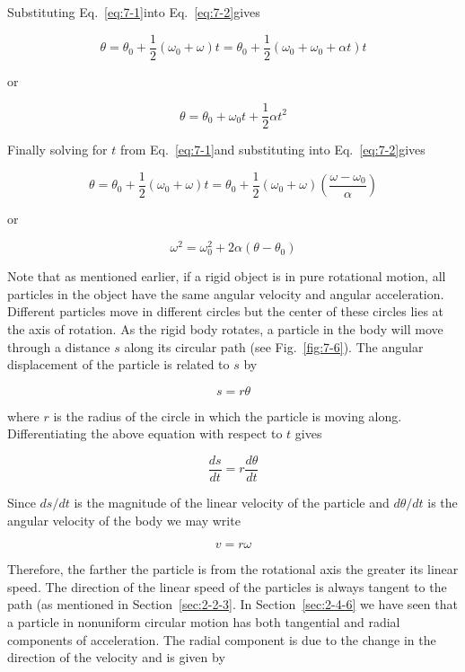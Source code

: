 \documentclass[10pt]{article}
\numberwithin{equation}{section}
\begin{document}
Substituting Eq.~\eqref{eq:7-1}into Eq.~\eqref{eq:7-2}gives

$$
\theta=\theta_{0}+\frac{1}{2}\left(\omega_{0}+\omega\right) t=\theta_{0}+\frac{1}{2}\left(\omega_{0}+\omega_{0}+\alpha t\right) t
$$

or


\begin{equation}
\theta=\theta_{0}+\omega_{0} t+\frac{1}{2} \alpha t^{2} \label{eq:7-3}
\end{equation}


Finally solving for $t$ from Eq.~\eqref{eq:7-1}and substituting into Eq.~\eqref{eq:7-2}gives

$$
\theta=\theta_{0}+\frac{1}{2}\left(\omega_{0}+\omega\right) t=\theta_{0}+\frac{1}{2}\left(\omega_{0}+\omega\right)\left(\frac{\omega-\omega_{0}}{\alpha}\right)
$$

or


\begin{equation}
\omega^{2}=\omega_{0}^{2}+2 \alpha\left(\theta-\theta_{0}\right) \label{eq:7-4}
\end{equation}


Note that as mentioned earlier, if a rigid object is in pure rotational motion, all particles in the object have the same angular velocity and angular acceleration. Different particles move in different circles but the center of these circles lies at the axis of rotation. As the rigid body rotates, a particle in the body will move through a distance $s$ along its circular path (see Fig.~\ref{fig:7-6}). The angular displacement of the particle is related to $s$ by

$$
s=r \theta
$$

where $r$ is the radius of the circle in which the particle is moving along. Differentiating the above equation with respect to $t$ gives

$$
\frac{d s}{d t}=r \frac{d \theta}{d t}
$$

Since $d s / d t$ is the magnitude of the linear velocity of the particle and $d \theta / d t$ is the angular velocity of the body we may write


\begin{equation}
v=r \omega \label{eq:7-5}
\end{equation}


Therefore, the farther the particle is from the rotational axis the greater its linear speed. The direction of the linear speed of the particles is always tangent to the path (as mentioned in Section~\ref{sec:2-2-3}. In Section~\ref{sec:2-4-6} we have seen that a particle in nonuniform circular motion has both tangential and radial components of acceleration. The radial component is due to the change in the direction of the velocity and is given by
\end{document}
